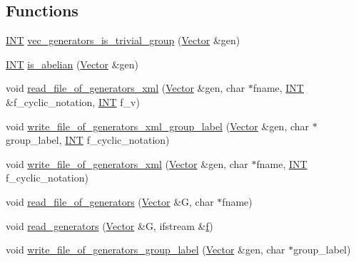 \subsection*{Functions}
\begin{DoxyCompactItemize}
\item 
\mbox{\hyperlink{galois_8h_a09fddde158a3a20bd2dcadb609de11dc}{I\+NT}} \mbox{\hyperlink{perm__group__gens_8_c_ab87d0c1fef9d3078f5ce5f1358bc398a}{vec\+\_\+generators\+\_\+is\+\_\+trivial\+\_\+group}} (\mbox{\hyperlink{class_vector}{Vector}} \&gen)
\item 
\mbox{\hyperlink{galois_8h_a09fddde158a3a20bd2dcadb609de11dc}{I\+NT}} \mbox{\hyperlink{perm__group__gens_8_c_ac0291199b2706f0eb554ae24d2e7cefc}{is\+\_\+abelian}} (\mbox{\hyperlink{class_vector}{Vector}} \&gen)
\item 
void \mbox{\hyperlink{perm__group__gens_8_c_acc8a80f029f6dab3698452c49e06b783}{read\+\_\+file\+\_\+of\+\_\+generators\+\_\+xml}} (\mbox{\hyperlink{class_vector}{Vector}} \&gen, char $\ast$fname, \mbox{\hyperlink{galois_8h_a09fddde158a3a20bd2dcadb609de11dc}{I\+NT}} \&f\+\_\+cyclic\+\_\+notation, \mbox{\hyperlink{galois_8h_a09fddde158a3a20bd2dcadb609de11dc}{I\+NT}} f\+\_\+v)
\item 
void \mbox{\hyperlink{perm__group__gens_8_c_a937affd15a6c49ebf8cd5118198fe5a4}{write\+\_\+file\+\_\+of\+\_\+generators\+\_\+xml\+\_\+group\+\_\+label}} (\mbox{\hyperlink{class_vector}{Vector}} \&gen, char $\ast$group\+\_\+label, \mbox{\hyperlink{galois_8h_a09fddde158a3a20bd2dcadb609de11dc}{I\+NT}} f\+\_\+cyclic\+\_\+notation)
\item 
void \mbox{\hyperlink{perm__group__gens_8_c_afdd96b23ffd162968dc51417edd6b516}{write\+\_\+file\+\_\+of\+\_\+generators\+\_\+xml}} (\mbox{\hyperlink{class_vector}{Vector}} \&gen, char $\ast$fname, \mbox{\hyperlink{galois_8h_a09fddde158a3a20bd2dcadb609de11dc}{I\+NT}} f\+\_\+cyclic\+\_\+notation)
\item 
void \mbox{\hyperlink{perm__group__gens_8_c_a4e32af1a953cd573a544c550971a6600}{read\+\_\+file\+\_\+of\+\_\+generators}} (\mbox{\hyperlink{class_vector}{Vector}} \&G, char $\ast$fname)
\item 
void \mbox{\hyperlink{perm__group__gens_8_c_a9e83943a9850c1c4c8ef0c293cd1d2b9}{read\+\_\+generators}} (\mbox{\hyperlink{class_vector}{Vector}} \&G, ifstream \&\mbox{\hyperlink{alphabet2_8_c_a362077c979b0bb65159c603270e40f70}{f}})
\item 
void \mbox{\hyperlink{perm__group__gens_8_c_ae43736cf13bd458db457ffee9f2dc141}{write\+\_\+file\+\_\+of\+\_\+generators\+\_\+group\+\_\+label}} (\mbox{\hyperlink{class_vector}{Vector}} \&gen, char $\ast$group\+\_\+label)

\end{DoxyCompactItemize}
